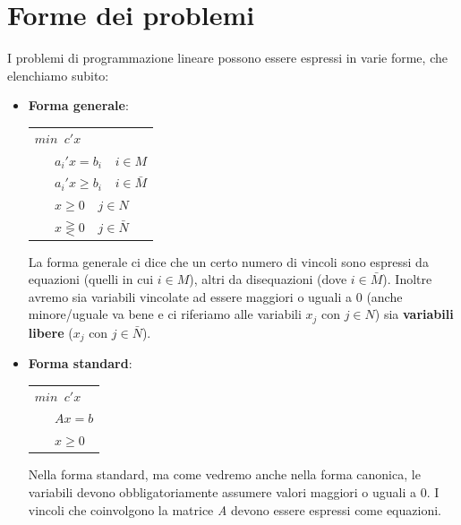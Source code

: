 \documentclass[11pt]{book}
\begin{document}
\section{Forme dei problemi}

I problemi di programmazione lineare possono essere espressi in varie
forme, che elenchiamo subito:

\begin{itemize}

\item {\bf Forma generale}: 

  \begin{center}
    \begin{tabular}{l}
      $min\phantom{a}c'x$ \\
      $\phantom{aaa}a_i'x = b_i \phantom{aa} i \in M$ \\
      $\phantom{aaa}a_i'x \geq b_i \phantom{aa} i \in \bar{M}$ \\
      $\phantom{aaa}x \geq 0\phantom{aa} j \in N$\\      
      $\phantom{aaa}x \gtreqless 0\phantom{aa} j \in \bar{N}$\\      
    \end{tabular}
  \end{center}

  La forma generale ci dice che un certo numero di vincoli sono
  espressi da equazioni (quelli in cui $i \in M$), altri da
  disequazioni (dove $i \in \bar{M}$). Inoltre avremo sia variabili
  vincolate ad essere maggiori o uguali a 0 (anche minore/uguale va
  bene e ci riferiamo alle variabili $x_j$ con $j \in N$) sia
  {\bf variabili libere} ($x_j$ con $j \in \bar{N}$).

\item {\bf Forma standard}:

  \begin{center}
    \begin{tabular}{l}
      $min\phantom{a}c'x$ \\
      $\phantom{aaa}Ax = b$ \\
      $\phantom{aaa}x \geq 0$ \\      
    \end{tabular}
  \end{center}

  Nella forma standard, ma come vedremo anche nella forma canonica, le
  variabili devono obbligatoriamente assumere valori maggiori o uguali
  a 0. I vincoli che coinvolgono la matrice {\em A} devono essere
  espressi come equazioni.


\end{itemize}
\end{document}
